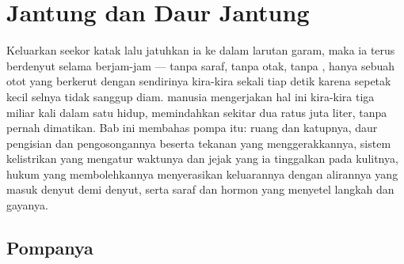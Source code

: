 \chapter{Jantung dan Daur Jantung}\label{ch:b2:heart}

Keluarkan  seekor katak lalu jatuhkan ia ke dalam larutan
garam, maka ia terus berdenyut selama berjam-jam --- tanpa saraf,
tanpa otak, tanpa , hanya sebuah otot yang berkerut dengan
sendirinya kira-kira sekali tiap detik karena sepetak kecil selnya
tidak sanggup diam.  manusia mengerjakan hal ini kira-kira tiga
miliar kali dalam satu hidup, memindahkan sekitar dua ratus juta liter,
tanpa pernah dimatikan. Bab ini membahas pompa itu: ruang dan katupnya,
daur pengisian dan pengosongannya beserta tekanan yang
menggerakkannya, sistem kelistrikan yang mengatur waktunya dan jejak
yang ia tinggalkan pada kulitnya, hukum yang membolehkannya menyerasikan
keluarannya dengan alirannya yang masuk denyut demi denyut, serta saraf
dan hormon yang menyetel langkah dan gayanya.

\section{Pompanya}

